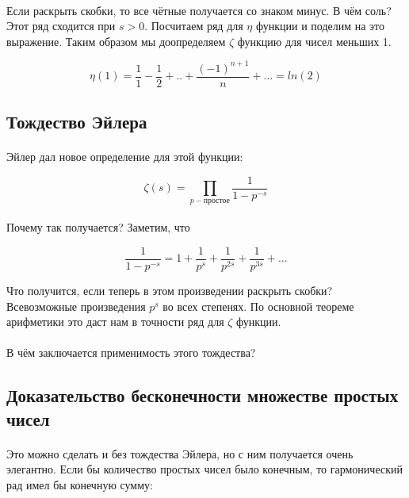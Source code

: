 \documentclass{article}
\begin{document}
\paragraph{}
Если раскрыть скобки, то все чётные получается со знаком минус.
В чём соль? Этот ряд сходится при $s > 0$. Посчитаем ряд для $\eta$ функции и
поделим на это выражение. Таким образом мы доопределяем $\zeta$ функцию для чисел меньших 1.

\[ \eta(1) = \frac{1}{1} - \frac{1}{2} + .. + \frac{(-1)^{n+1}}{n} + ... = ln(2) \]

\subsection{Тождество Эйлера}

\paragraph{}
Эйлер дал новое определение для этой функции:

\[ \zeta(s) = \prod_{p - \text{простое}} \frac{1}{1 - p^{-s}} \]

\paragraph{}
Почему так получается? Заметим, что 

\[ \frac{1}{1 - p^{-s}} = 1 + \frac{1}{p^s} + \frac{1}{p^{2s}} + \frac{1}{p^{3s}} + ... \]

Что получится, если теперь в этом произведении раскрыть скобки?
Всевозможные произведения $p^s$ во всех степенях. По основной теореме арифметики
это даст нам в точности ряд для $\zeta$ функции.

\paragraph{}
В чём заключается применимость этого тождества?

\subsection{Доказательство бесконечности множестве простых чисел}

\paragraph{}
Это можно сделать и без тождества Эйлера, но с ним получается очень элегантно. Если бы количество простых чисел было конечным, то гармонический рад имел бы
конечную сумму:
\end{document}

